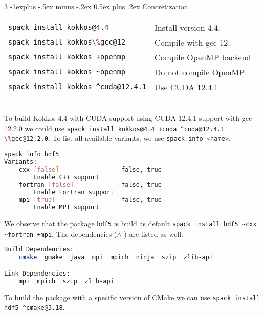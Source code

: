 \documentclass[10pt,landscape]{article}
\makeatletter
\renewcommand{\subsection}{\@startsection{subsection}{2}{0mm}%
                                {-1explus -.5ex minus -.2ex}%
                                {0.5ex plus .2ex}%
                                {\normalfont\normalsize\bfseries}}
\newcommand{\bash}[1]{\lstinline[language=bash]{#1}}
\makeatother
\begin{document}
\begin{multicols}{3}
\subsection{Concretization}
\begin{tabular}{@{}ll@{}}
\bash{spack install kokkos@4.4} & Install version 4.4. \\ 
\bash{spack install kokkos\%gcc@12} & Compile with gcc 12. \\ 
\bash{spack install kokkos +openmp} & Compile OpenMP backend \\ 
\bash{spack install kokkos ~openmp} & Do not compile OpenMP \\ 
\bash{spack install kokkos ^cuda@12.4.1} & Use CUDA 12.4.1 \\ 
\end{tabular} \\
To build Kokkos 4.4  with CUDA support using CUDA 12.4.1 support with gcc 12.2.0 we could use
\bash{spack install kokkos@4.4 +cuda ^cuda@12.4.1 \%gcc@12.2.0}.
To list all available variants, we use \bash{spack info <name>}.
\begin{lstlisting}[language=bash,style=mystyle]
spack info hdf5
Variants:
    cxx [false]                 false, true
        Enable C++ support
    fortran [false]             false, true
        Enable Fortran support
    mpi [true]                  false, true
        Enable MPI support
\end{lstlisting}
We observe that the package \bash{hdf5}  is build as default
\bash{spack install hdf5 ~cxx ~fortran +mpi}. The dependencies ($\wedge$ ) are listed as well.
\begin{lstlisting}[language=bash,style=mystyle]
Build Dependencies:
    cmake  gmake  java  mpi  mpich  ninja  szip  zlib-api

Link Dependencies:
    mpi  mpich  szip  zlib-api
\end{lstlisting}
To build the package with a specific version of  CMake we can use \bash{spack install hdf5 ^cmake@3.18}.


\end{multicols}
\end{document}
